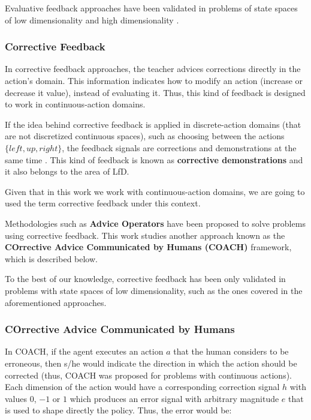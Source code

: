 Evaluative feedback approaches have been validated in problems of state spaces of low dimensionality \cite{Knox:2009:ISA:1597735.1597738,akrour2011preference,macglashan2017interactive} and high dimensionality \cite{Christiano2017,Warnell2017}.

\subsubsection{Corrective Feedback}

In corrective feedback approaches, the teacher advices corrections directly in the action's domain. This information indicates how to modify an action (increase or decrease it value), instead of evaluating it. Thus, this kind of feedback is designed to work in continuous-action domains. 

If the idea behind corrective feedback is applied in discrete-action domains (that are not discretized continuous spaces), such as choosing between the actions $\{left, up, right\}$, the feedback signals  are corrections and demonstrations at the same time \cite{chernova2009interactive, mericcli2010complementary}. This kind of feedback is known as \textbf{corrective demonstrations} and it also belongs to the area of LfD. 

Given that in this work we work with continuous-action domains, we are going to used the term corrective feedback under this context.  

Methodologies such as \textbf{Advice Operators} \cite{Argall2009, Argall2008} have been proposed to solve problems using corrective feedback. This work studies another approach known as the \textbf{COrrective Advice Communicated by Humans (COACH)} \cite{Celemin2018AnInteractive} framework, which is described below. 

To the best of our knowledge, corrective feedback has been only validated in problems with state spaces of low dimensionality, such as the ones covered in the aforementioned approaches. 

\newpage

\subsubsection{COrrective Advice Communicated by Humans}
\label{sss:COACH}
In COACH, if the agent executes an action $a$ that the human considers to be erroneous, then s/he would indicate the direction in which the action should be corrected (thus, COACH was proposed for problems with continuous actions). Each dimension of the action would have a corresponding correction signal $h$ with values $0$, $-1$ or $1$ which produces an error signal with arbitrary magnitude $e$ that is used to shape directly the policy. Thus, the error would be: 

